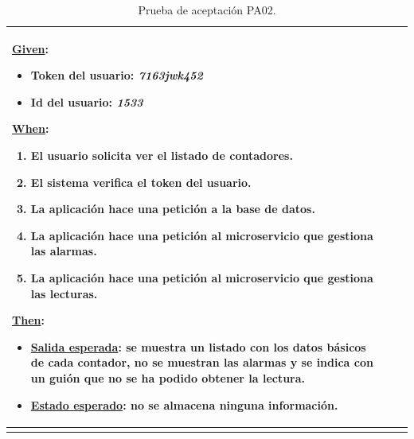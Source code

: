 \documentclass[pdftex,11pt,a4paper]{book}
\begin{document}
\begin{center}
\begin{longtable}{|>{\centering\arraybackslash}X m{2cm}|m{12cm}|}
\underline{Given}:
\vspace{-3mm}
\begin{itemize}
\addtolength{\itemsep}{-3mm}
\item Token del usuario: \textit{7163jwk452}
\item Id del usuario: \textit{1533}
\end{itemize}

\underline{When}:
\begin{enumerate}
\vspace{-3mm}
\addtolength{\itemsep}{-3mm}
\item El usuario solicita ver el listado de contadores.
\item El sistema verifica el token del usuario.
\item La aplicación hace una petición a la base de datos.
\item La aplicación hace una petición al microservicio que gestiona las alarmas.
\item La aplicación hace una petición al microservicio que gestiona las lecturas.
\end{enumerate}
\break

\underline{Then}:
\vspace{-3mm}
\begin{itemize}
\addtolength{\itemsep}{-3mm}
\item \underline{Salida esperada}: se muestra un listado con los datos básicos de cada contador, no se muestran las alarmas y se indica con un guión que no se ha podido obtener la lectura.
\item \underline{Estado esperado}: no se almacena ninguna información.
\end{itemize}
\\ \hline

\caption{Prueba de aceptación PA02.} \label{tablalarga:tablaPA02}
\end{longtable}
\end{center}



\renewcommand{\tablename}{Tabla}
\renewcommand{\arraystretch}{1,7}
\end{document}
